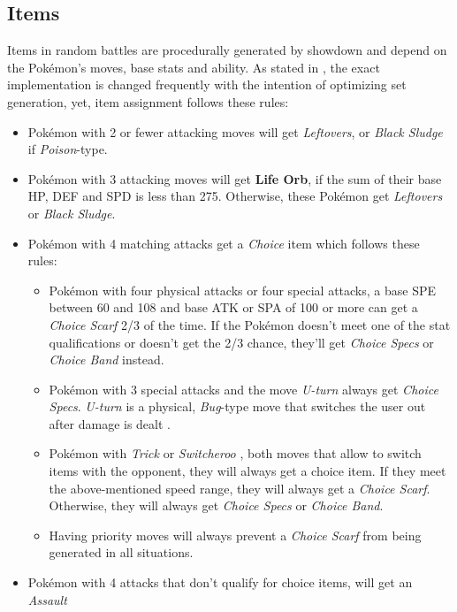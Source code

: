 \subsection{Items}
\label{sec:randbats-items}
Items in random battles are procedurally generated by showdown and depend on the Pokémon's
moves, base stats and ability. As stated in \cite{Smogon:RandBatsGuide}, the exact implementation
is \grqq changed frequently with the intention of optimizing set generation\grqq, yet, item
assignment follows these rules:
\begin{itemize}
	\item Pokémon with 2 or fewer attacking moves will get \textit{Leftovers}, or 
	\textit{Black Sludge} if \textit{Poison}-type.
	\item Pokémon with 3 attacking moves will get \textbf{Life Orb}, if the sum of their base
	\ac{HP}, \ac{DEF} and \ac{SPD} is less than 275. Otherwise, these Pokémon get 
	\textit{Leftovers} or \textit{Black Sludge}.
	\item Pokémon with 4 matching attacks get a \textit{Choice} item which follows these rules:
	\begin{itemize}
		\item Pokémon with four physical attacks or four special attacks, a base \ac{SPE} between
		60 and 108 and base \ac{ATK} or \ac{SPA} of 100 or more can get a \textit{Choice Scarf}
		2/3 of the time. If the Pokémon doesn't meet one of the stat qualifications or doesn't
		get the 2/3 chance, they'll get \textit{Choice Specs} or \textit{Choice Band} instead.
		\item Pokémon with 3 special attacks and the move \textit{U-turn} always get 
		\textit{Choice Specs}. \textit{U-turn} is a physical, \textit{Bug}-type move that 
		switches the user out after damage is dealt \cite{Bulbapedia:UTurn}.
		\item Pokémon with \textit{Trick} \cite{Bulbapedia:Trick} or \textit{Switcheroo} 
		\cite{Bulbapedia:Switcheroo}, both moves that allow to switch items
		with the opponent, they will always get a choice item. If they meet the above-mentioned 
		speed range, they will always get a \textit{Choice Scarf}. Otherwise, they will always
		get \textit{Choice Specs} or \textit{Choice Band}.
		\item Having priority moves will always prevent a \textit{Choice Scarf} from being 
		generated in all situations.
	\end{itemize}
	\item Pokémon with 4 attacks that don't qualify for choice items, will get an \textit{Assault
}
\end{itemize}
